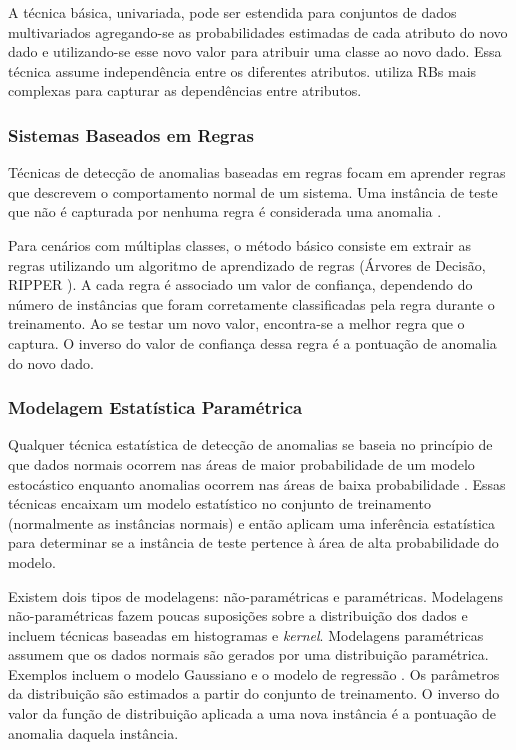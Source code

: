\documentclass[cic,tc]{iiufrgs}
\begin{document}
A técnica básica, univariada, pode ser estendida para conjuntos de dados multivariados agregando-se as probabilidades estimadas de cada atributo do novo dado e utilizando-se esse novo valor para atribuir uma classe ao novo dado. Essa técnica assume independência entre os diferentes atributos. \cite{BayesianBelief} utiliza RBs mais complexas para capturar as dependências entre atributos.

\subsubsection{Sistemas Baseados em Regras}
Técnicas de detecção de anomalias baseadas em regras focam em aprender regras que descrevem o comportamento normal de um sistema. Uma instância de teste que não é capturada por nenhuma regra é considerada uma anomalia \cite{ContextualMichael2014}.

Para cenários com múltiplas classes, o método básico consiste em extrair as regras utilizando um algoritmo de aprendizado de regras (Árvores de Decisão, RIPPER \cite{cohen1995fast}). A cada regra é associado um valor de confiança, dependendo do número de instâncias que foram corretamente classificadas pela regra durante o treinamento. Ao se testar um novo valor, encontra-se a melhor regra que o captura. O inverso do valor de confiança dessa regra é a pontuação de anomalia do novo dado.

\subsubsection{Modelagem Estatística Paramétrica}
Qualquer técnica estatística de detecção de anomalias se baseia no princípio de que dados normais ocorrem nas áreas de maior probabilidade de um modelo estocástico enquanto anomalias ocorrem nas áreas de baixa probabilidade \cite{AnomalyDetectionSurvey2009}. Essas técnicas encaixam um modelo estatístico no conjunto de treinamento (normalmente as instâncias normais) e então aplicam uma inferência estatística para determinar se a instância de teste pertence à área de alta probabilidade do modelo.

Existem dois tipos de modelagens: não-paramétricas e paramétricas. Modelagens não-paramétricas fazem poucas suposições sobre a distribuição dos dados e incluem técnicas baseadas em histogramas e \textit{kernel}. Modelagens paramétricas assumem que os dados normais são gerados por uma distribuição paramétrica. Exemplos incluem o modelo Gaussiano e o modelo de regressão \cite{AnomalyDetectionSurvey2009}. Os parâmetros da distribuição são estimados a partir do conjunto de treinamento. O inverso do valor da função de distribuição aplicada a uma nova instância é a pontuação de anomalia daquela instância.
\end{document}
